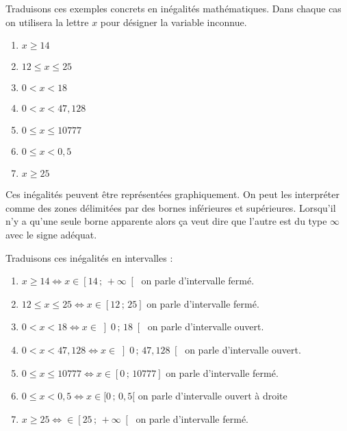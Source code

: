\documentclass[a4paper, 11pt, twoside]{article}
\newcommand{\intr}[4]{\left #1 #2\,;\,#3 \right #4}
\begin{document}
Traduisons ces exemples concrets en inégalités mathématiques. Dans
chaque cas on utilisera la lettre \(x\) pour désigner la variable
inconnue.

\begin{enumerate}
\item \(x \geq 14\)
\item \(12 \leq x \leq 25\)
\item \(0 < x < 18\)
\item \(0 < x < 47,128\)
\item \(0 \leq x \leq 10 777\)
\item \(0 \leq x < 0,5\)
\item \(x \geq 25\)
\end{enumerate}

Ces inégalités peuvent être représentées graphiquement. On peut les
interpréter comme des zones délimitées par des bornes inférieures
et supérieures. Lorsqu'il n'y a qu'une seule borne apparente alors
ça veut dire que l'autre est du type \(\infty\) avec le signe
adéquat.

Traduisons ces inégalités en intervalles :

\begin{enumerate}
\item \(x \geq 14 \iff x\in \intr{[}{14}{+\infty}{[}\) on parle d'intervalle fermé.
\item \(12 \leq x \leq 25\iff x\in \intr{[}{12}{25}{]}\) on parle d'intervalle fermé.
\item \(0 < x < 18\iff x\in \intr{]}{0}{18}{[}\) on parle d'intervalle ouvert.
\item \(0 < x < 47,128\iff x\in \intr{]}{0}{47,128}{[}\) on parle d'intervalle
ouvert.
\item \(0\leq x \leq 10 777\iff x\in \intr{[}{0}{10777}{]}\) on parle d'intervalle
fermé.
\item \(0 \leq x < 0,5\iff x\in [0\,;\,0,5[\) on parle d'intervalle ouvert à droite
\item \(x \geq 25\iff \in \intr{[}{25}{+\infty}{[}\) on parle d'intervalle fermé.
\end{enumerate}
\end{document}
